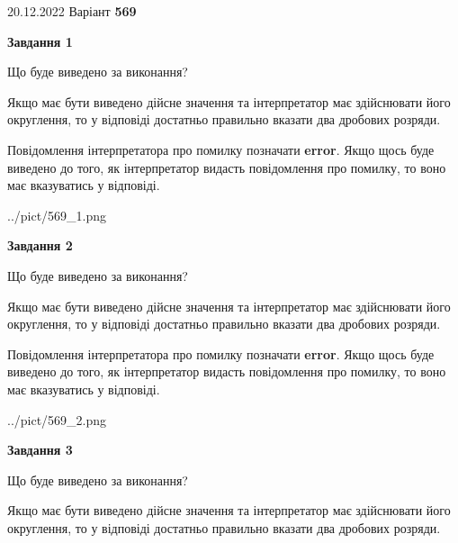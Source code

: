\documentclass[12pt, ukrainian]{article}
\begin{document}
{20.12.2022 Варіант \No \textbf { 569 }\par}
{
\begin {Large}

{\begin {center}\textbf{Завдання 1}\end {center}}\par
Що буде виведено за виконання? \par

Якщо має бути виведено дійсне значення та інтерпретатор має здійснювати його округлення, 
то у відповіді достатньо правильно вказати два дробових розряди.

Повідомлення інтерпретатора про помилку позначати \textbf{error}.
Якщо щось буде виведено до того, як інтерпретатор видасть повідомлення про помилку, 
то воно має вказуватись у відповіді. \par

\begin{center}
	{../pict/569_1.png}
\end{center}
\newpage

{\begin {center}\textbf{Завдання 2}\end {center}}\par
Що буде виведено за виконання? \par

Якщо має бути виведено дійсне значення та інтерпретатор має здійснювати його округлення, 
то у відповіді достатньо правильно вказати два дробових розряди.

Повідомлення інтерпретатора про помилку позначати \textbf{error}.
Якщо щось буде виведено до того, як інтерпретатор видасть повідомлення про помилку, 
то воно має вказуватись у відповіді. \par

\begin{center}
	{../pict/569_2.png}
\end{center}
\newpage

{\begin {center}\textbf{Завдання 3}\end {center}}\par
Що буде виведено за виконання? \par

Якщо має бути виведено дійсне значення та інтерпретатор має здійснювати його округлення, 
то у відповіді достатньо правильно вказати два дробових розряди.


\end{Large}}
\end{document}
